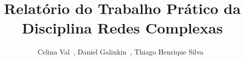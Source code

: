 \title{Relatório do Trabalho Prático da Disciplina Redes Complexas}

\author{Celina Val~, Daniel Galinkin~, Thiago Henrique
Silva~}


\address{Departamento de Ciência da Computação\\
   Universidade Federal de Minas Gerais (UFMG)\\
   31.270-010 -- Belo Horizonte -- MG -- Brasil
}                                                                      

\maketitle
